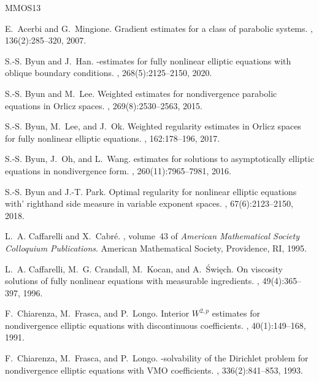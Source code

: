 \documentclass[11pt, reqno]{amsart}
\numberwithin{equation}{section}
\begin{document}
%
%


\begin{thebibliography}{MMOS13}

E.~Acerbi and G.~Mingione.
\newblock Gradient estimates for a class of parabolic systems.
, 136(2):285--320, 2007.

S.-S. Byun and J.~Han.
-estimates for fully nonlinear elliptic equations with
  oblique boundary conditions.
, 268(5):2125--2150, 2020.

S.-S. Byun and M.~Lee.
\newblock Weighted estimates for nondivergence parabolic equations in {O}rlicz
  spaces.
, 269(8):2530--2563, 2015.

S.-S. Byun, M.~Lee, and J.~Ok.
\newblock Weighted regularity estimates in {O}rlicz spaces for fully nonlinear
  elliptic equations.
, 162:178--196, 2017.

S.-S. Byun, J.~Oh, and L.~Wang.
 estimates for solutions to asymptotically elliptic
  equations in nondivergence form.
, 260(11):7965--7981, 2016.

S.-S. Byun and J.-T. Park.
\newblock Optimal regularity for nonlinear elliptic equations with' righthand
  side measure in variable exponent spaces.
, 67(6):2123--2150, 2018.

L.~A. Caffarelli and X.~Cabr\'{e}.
, volume~43 of {\em American
  Mathematical Society Colloquium Publications}.
\newblock American Mathematical Society, Providence, RI, 1995.

L.~A. Caffarelli, M.~G. Crandall, M.~Kocan, and A.~\'{S}wi\k{e}ch.
\newblock On viscosity solutions of fully nonlinear equations with measurable
  ingredients.
, 49(4):365--397, 1996.

F.~Chiarenza, M.~Frasca, and P.~Longo.
\newblock Interior {$W^{2,p}$} estimates for nondivergence elliptic equations
  with discontinuous coefficients.
, 40(1):149--168, 1991.

F.~Chiarenza, M.~Frasca, and P.~Longo.
-solvability of the {D}irichlet problem for nondivergence
  elliptic equations with {VMO} coefficients.
, 336(2):841--853, 1993.


\end{thebibliography}
\end{document}
